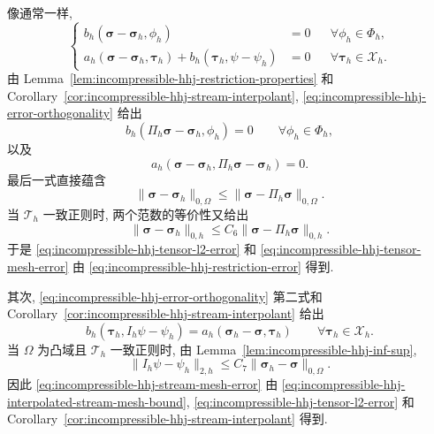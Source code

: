 \begin{Proof}
像通常一样,
\begin{equation}\label{eq:incompressible-hhj-error-orthogonality}
\left\{
\begin{aligned}
b_h(\boldsymbol\sigma-\boldsymbol\sigma_h,\phi_h)&=0
&&\forall\phi_h\in\Phi_h,\\
a_h(\boldsymbol\sigma-\boldsymbol\sigma_h,\boldsymbol\tau_h)
+b_h(\boldsymbol\tau_h,\psi-\psi_h)&=0
&&\forall\boldsymbol\tau_h\in\mathcal X_h.
\end{aligned}
\right.
\end{equation}
由 Lemma~\ref{lem:incompressible-hhj-restriction-properties}
和 Corollary~\ref{cor:incompressible-hhj-stream-interpolant},
\eqref{eq:incompressible-hhj-error-orthogonality} 给出
\[
b_h(\Pi_h\boldsymbol\sigma-\boldsymbol\sigma_h,\phi_h)=0
\qquad\forall\phi_h\in\Phi_h,
\]
以及
\[
a_h(\boldsymbol\sigma-\boldsymbol\sigma_h,
\Pi_h\boldsymbol\sigma-\boldsymbol\sigma_h)=0.
\]
最后一式直接蕴含
\begin{equation}\label{eq:incompressible-hhj-best-tensor-l2}
\|\boldsymbol\sigma-\boldsymbol\sigma_h\|_{0,\Omega}
\leq\|\boldsymbol\sigma-\Pi_h\boldsymbol\sigma\|_{0,\Omega}.
\end{equation}
当 $\mathcal T_h$ 一致正则时, 两个范数的等价性又给出
\begin{equation}\label{eq:incompressible-hhj-best-tensor-mesh}
\|\boldsymbol\sigma-\boldsymbol\sigma_h\|_{0,h}
\leq C_6\|\boldsymbol\sigma-\Pi_h\boldsymbol\sigma\|_{0,h}.
\end{equation}
于是 \eqref{eq:incompressible-hhj-tensor-l2-error}
和 \eqref{eq:incompressible-hhj-tensor-mesh-error}
由 \eqref{eq:incompressible-hhj-restriction-error} 得到.

其次, \eqref{eq:incompressible-hhj-error-orthogonality}
第二式和 Corollary~\ref{cor:incompressible-hhj-stream-interpolant} 给出
\begin{equation}\label{eq:incompressible-hhj-stream-error-identity}
b_h(\boldsymbol\tau_h,I_h\psi-\psi_h)
=a_h(\boldsymbol\sigma_h-\boldsymbol\sigma,\boldsymbol\tau_h)
\qquad\forall\boldsymbol\tau_h\in\mathcal X_h.
\end{equation}
当 $\Omega$ 为凸域且 $\mathcal T_h$ 一致正则时,
由 Lemma~\ref{lem:incompressible-hhj-inf-sup},
\begin{equation}\label{eq:incompressible-hhj-interpolated-stream-mesh-bound}
\|I_h\psi-\psi_h\|_{2,h}
\leq C_7\|\boldsymbol\sigma_h-\boldsymbol\sigma\|_{0,\Omega}.
\end{equation}
因此 \eqref{eq:incompressible-hhj-stream-mesh-error}
由 \eqref{eq:incompressible-hhj-interpolated-stream-mesh-bound},
\eqref{eq:incompressible-hhj-tensor-l2-error}
和 Corollary~\ref{cor:incompressible-hhj-stream-interpolant} 得到.


\end{Proof}

